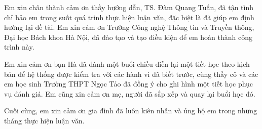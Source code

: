 Em xin chân thành cảm ơn thầy hướng dẫn, TS. Đàm Quang Tuấn, đã tận tình chỉ bảo em trong suốt quá trình thực hiện luận văn, đặc biệt là đã giúp em định hướng lại đề tài. Em xin cảm ơn Trường Công nghệ Thông tin và Truyền thông, Đại học Bách khoa Hà Nội, đã đào tạo và tạo điều kiện để em hoàn thành công trình này.

Em xin cảm ơn bạn Hà đã dành một buổi chiều diễn lại một tiết học theo kịch bản để hệ thống được kiểm tra với các hành vi đã biết trước, cùng thầy cô và các em học sinh Trường THPT Ngọc Tảo đã đồng ý cho ghi hình một tiết học phục vụ đánh giá. Em cũng xin cảm ơn mẹ, người đã sắp xếp và quay lại buổi học đó.

Cuối cùng, em xin cảm ơn gia đình đã luôn kiên nhẫn và ủng hộ em trong những tháng thực hiện luận văn.
